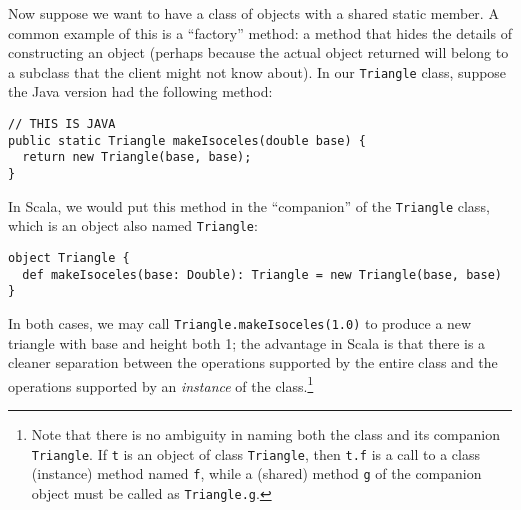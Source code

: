 Now suppose we want to have a class of objects with a shared static member. A common example of this is a ``factory'' method: a method that hides the details of constructing an object (perhaps because the actual object returned will belong to a subclass that the client might not know about). In our \texttt{Triangle} class, suppose the Java version had the following method:
\begin{verbatim}
// THIS IS JAVA
public static Triangle makeIsoceles(double base) {
  return new Triangle(base, base);
}
\end{verbatim}
In Scala, we would put this method in the ``companion'' of the \texttt{Triangle} class, which is an object also named \texttt{Triangle}:
\begin{verbatim}
object Triangle {
  def makeIsoceles(base: Double): Triangle = new Triangle(base, base)
}
\end{verbatim}
In both cases, we may call \texttt{Triangle.makeIsoceles(1.0)} to produce a new triangle with base and height both 1; the advantage in Scala is that there is a cleaner separation between the operations supported by the entire class and the operations supported by an \emph{instance} of the class.\footnote{Note that there is no ambiguity in naming both the class and its companion \texttt{Triangle}. If \texttt{t} is an object of class \texttt{Triangle}, then \texttt{t.f} is a call to a class (instance) method named \texttt{f}, while a (shared) method \texttt{g} of the companion object must be called as \texttt{Triangle.g}.}

